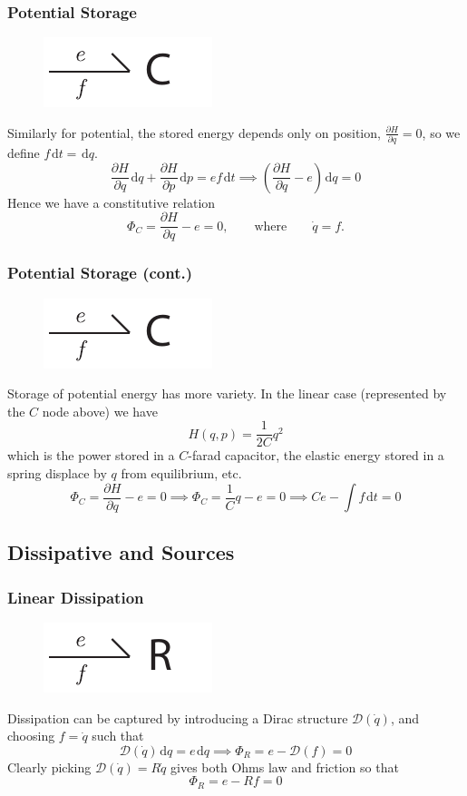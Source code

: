 \documentclass[11pt,reqno]{beamer}
\renewcommand{\P}[2]{\frac{\partial #1}{\partial #2}}
\newcommand{\df}[1]{\mspace{2mu}  \mathrm{d}#1}
\begin{document}
\begin{frame}
\frametitle{Potential Storage}
\begin{figure}
	\includegraphics{images/oneport-C.pdf}
\end{figure}
Similarly for potential, the stored energy depends only on position, $\P{H}{q} = 0$, so we define $f\df{t} = \df{q}$.
\[
\P{H}{q} \df{q} + \P{H}{p}\df{p} = ef\df{t} \implies  \left(\P{H}{q} - e\right)\df{q}= 0
\]
Hence we have a constitutive relation
\[
\Phi_C = \P{H}{q} - e= 0, \qquad  \text{where}\qquad \dot{q} = f.
\]
\end{frame}

\begin{frame}
\frametitle{Potential Storage (cont.)}
\begin{figure}
	\includegraphics{images/oneport-C.pdf}
\end{figure}
Storage of potential energy has more variety. In the linear case (represented by the $C$ node above) we have
\[
H(q,p) =\frac{1}{2C} q^2 
\]
which is the power stored in a $C$-farad capacitor, the elastic energy stored in a spring displace by $q$ from equilibrium, etc.
\[
\Phi_C = \P{H}{q} - e= 0\implies  \Phi_C = \frac{1}{C}q - e =0  \implies Ce - \int f \df{t} = 0
\]
\end{frame}

\subsection{Dissipative and Sources}
\begin{frame}
\frametitle{Linear Dissipation}
\begin{figure}
	\includegraphics{images/oneport-R.pdf}
\end{figure}
Dissipation can be captured by introducing a Dirac structure $\mathcal{D}(\dot{q})$, and choosing $f = \dot{q}$ such that
\[
\mathcal{D}(\dot{q})\df{q} = e\df{q} \implies \Phi_R = e - \mathcal{D}(f) =0\]
Clearly picking $\mathcal{D}(\dot{q}) = R\dot{q}$ gives both Ohms law and friction so that
\[
\Phi_R = e - Rf = 0
\]
\end{frame}
\end{document}
